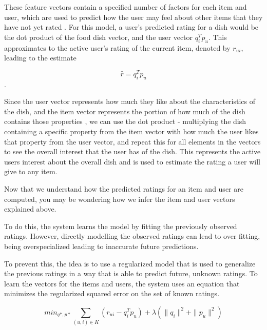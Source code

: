 These feature vectors contain a specified number of factors for each item and user, which are used to predict how the user may feel about other items that they have not yet rated \cite{koren2009matrix}. For this model, a user's predicted rating for a dish would be the dot product of the food dish vector, and the user vector \begin{math} q_{i}^T p_{u} \end{math}. This approximates to the active user's rating of the current item, denoted by \begin{math} r_{ui} \end{math}, leading to the estimate \cite{koren2009matrix}

\begin{equation}\label{eq:1}\tag{1} \widehat{r} = q_{i}^T p_{u} \end{equation}.


Since the user vector represents how much they like about the characteristics of the dish, and the item vector represents the portion of how much of the dish contains those properties \cite{koren2009matrix}, we can use the dot product - multiplying the dish containing a specific property from the item vector with how much the user likes that property from the user vector, and repeat this for all elements in the vectors to see the overall interest that the user has of the dish. This represents the active users interest about the overall dish and is used to estimate the rating a user will give to any item. 

Now that we understand how the predicted ratings for an item and user are computed, you may be wondering how we infer the item and user vectors explained above. 

To do this, the system learns the model by fitting the previously observed ratings. However, directly modelling the observed ratings can lead to over fitting, being overspecialized leading to inaccurate future predictions.

To prevent this, the idea is to use a regularized model that is used to generalize the previous ratings in a way that is able to predict future, unknown ratings. To learn the vectors for the items and users, the system uses an equation that minimizes the regularized squared error on the set of known ratings.

\begin{equation}\label{eq:2}\tag{2}
\displaystyle min_{q*,p*} \sum_{ (u,i) \in K} (r_{ui} - q_{i}^T p_{u}) + \lambda (\| q_{i} \|^2 + \| p_{u} \|^2 )
\end{equation}

